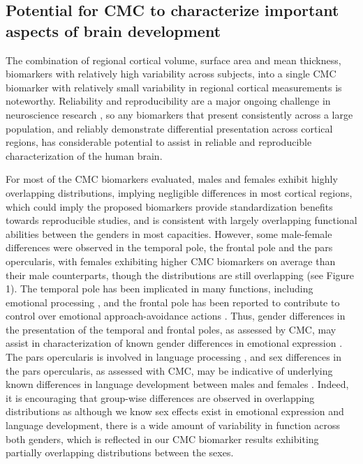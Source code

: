 \documentclass{article}
\begin{document}
%

\subsection{Potential for CMC to characterize important aspects of brain development}

The combination of regional cortical volume, surface area and mean thickness,
biomarkers with relatively high variability across subjects, into a single
CMC biomarker with relatively small variability in regional cortical
measurements is noteworthy. Reliability and reproducibility are a major
ongoing challenge in neuroscience research
\citep{martinezReproducibilityBraincognitionRelationships2015,marekReproducibleBrainwideAssociation2022},
so any biomarkers that present consistently across a large population, and
reliably demonstrate differential presentation across cortical regions, has
considerable potential to assist in reliable and reproducible
characterization of the human brain.

For most of the CMC biomarkers evaluated, males and females exhibit highly
overlapping distributions, implying negligible differences in most cortical
regions, which could imply the proposed biomarkers provide standardization
benefits towards reproducible studies, and is consistent with largely
overlapping functional abilities between the genders in most capacities.
However, some male-female differences were observed in the temporal pole, the
frontal pole and the pars opercularis, with females exhibiting higher CMC
biomarkers on average than their male counterparts, though the distributions
are still overlapping (see Figure 1). The temporal pole has been implicated
in many functions, including emotional processing
\citep{corcoles-paradaFrontalInsularInput2019}, and the frontal pole has been
reported to contribute to control over emotional approach-avoidance actions
\citep{bramsonHumanLateralFrontal2020}. Thus, gender differences in the
presentation of the temporal and frontal poles, as assessed by CMC, may
assist in characterization of known gender differences in emotional
expression \citep{chaplinGenderEmotionExpression2015}. The pars opercularis
is involved in language processing \citep{greweEmergenceUnmarkedNew2005}, and
sex differences in the pars opercularis, as assessed with CMC, may be
indicative of underlying known differences in language development between
males and females \citep{satoNeurobiologySexDifferences2020}. Indeed, it is
encouraging that group-wise differences are observed in overlapping
distributions as although we know sex effects exist in emotional expression
and language development, there is a wide amount of variability in function
across both genders, which is reflected in our CMC biomarker results
exhibiting partially overlapping distributions between the sexes.
\end{document}
